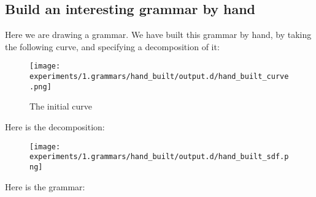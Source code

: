 
\subsection{Build an interesting grammar by hand}


Here we are drawing a grammar. We have built this grammar by hand, by
taking the following curve, and specifying a decomposition of it:

\begin{figure}
\texttt{[image: experiments/1.grammars/hand\_built/output.d/hand\_built\_curve.png]}
\caption{The initial curve}
\end{figure}

Here is the decomposition:
\begin{figure}
\texttt{[image: experiments/1.grammars/hand\_built/output.d/hand\_built\_sdf.png]}
\end{figure}

Here is the grammar:


